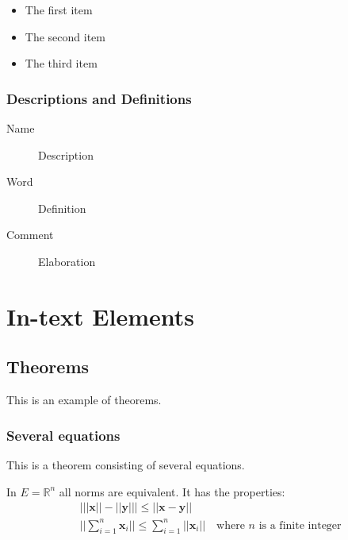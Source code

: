 \begin{itemize}
	\item The first item
	\item The second item
	\item The third item
\end{itemize}

\subsection{Descriptions and Definitions}

\begin{description}
	\item[Name] Description
	\item[Word] Definition
	\item[Comment] Elaboration
\end{description}


\chapter{In-text Elements}

\section{Theorems}

This is an example of theorems.

\subsection{Several equations}
This is a theorem consisting of several equations.

\begin{theorem}
	In $E=\mathbb{R}^n$ all norms are equivalent. It has the properties:
	\begin{align}
		& \big| ||\mathbf{x}|| - ||\mathbf{y}|| \big|\leq || \mathbf{x}- \mathbf{y}||\\
		&  ||\sum_{i=1}^n\mathbf{x}_i||\leq \sum_{i=1}^n||\mathbf{x}_i||\quad\text{where $n$ is a finite integer}
	\end{align}
\end{theorem}

